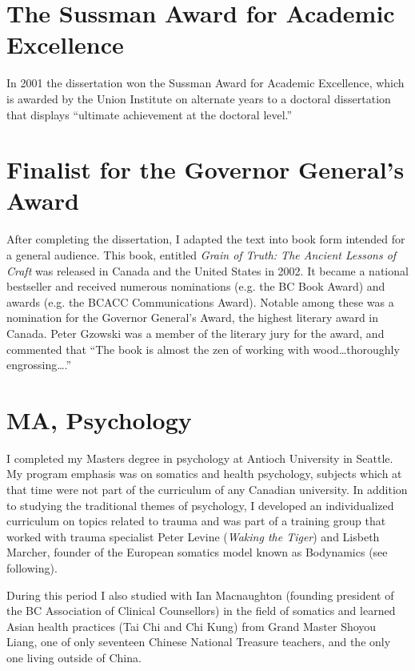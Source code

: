 \documentclass[10pt,DIV09,letterpaper,oneside,headsepline]{scrreprt}
\begin{document}
\section{The Sussman Award for Academic Excellence}

In 2001 the dissertation won the Sussman Award for Academic Excellence, which is awarded by the Union Institute on alternate years to a doctoral dissertation that displays ``ultimate achievement at the doctoral level.''

\section{Finalist for the Governor General's Award}

After completing the dissertation, I adapted the text into book form intended for a general audience. This book, entitled \textit{Grain of Truth: The Ancient Lessons of Craft} was released in Canada and the United States in 2002. It became a national bestseller and received numerous nominations (e.g. the BC Book Award) and awards (e.g. the BCACC Communications Award). Notable among these was a nomination for the Governor General's Award, the highest literary award in Canada. Peter Gzowski was a member of the literary jury for the award, and commented that ``The book is almost the zen of working with wood\ldots thoroughly engrossing\ldots.''
\newpage
\section{MA, Psychology}

I completed my Masters degree in psychology at Antioch University in Seattle. My program emphasis was on somatics and health psychology, subjects which at that time were not part of the curriculum of any Canadian university. In addition to studying the traditional themes of psychology, I developed an individualized curriculum on topics related to trauma and was part of a training group that worked with trauma specialist Peter Levine (\textit{Waking the Tiger}) and Lisbeth Marcher, founder of the European somatics model known as Bodynamics (see following).

During this period I also studied with Ian Macnaughton (founding president of the BC Association of Clinical Counsellors) in the field of somatics and learned Asian health practices (Tai Chi and Chi Kung) from Grand Master Shoyou Liang, one of only seventeen Chinese National Treasure teachers, and the only one living outside of China.
\end{document}
